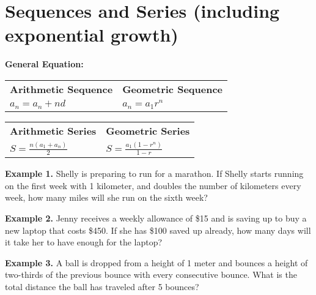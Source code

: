 \section{Sequences and Series (including exponential growth)}

\bigskip
\textbf{General Equation:}

\bigskip
\begin{tabularx}{\textwidth}{*2{@{}>{\centering\arraybackslash}X}}
\textbf{Arithmetic Sequence} & \textbf{Geometric Sequence}\\
$a_n=a_n+nd$ & $a_n=a_1r^n$
\end{tabularx}

\vfill
\begin{tabularx}{\textwidth}{*2{@{}>{\centering\arraybackslash}X}}
\textbf{Arithmetic Series} & \textbf{Geometric Series}\\
$S=\frac{n(a_1+a_n)}{2}$ & $S=\frac{a_1(1-r^n)}{1-r}$
\end{tabularx}

\vfill
\textbf{Example 1.} Shelly is preparing to run for a marathon. If Shelly starts running on the first week with 1 kilometer, and doubles the number of kilometers every week, how many miles will she run on the sixth week?

\vfill
\textbf{Example 2.} Jenny receives a weekly allowance of \$15 and is saving up to buy a new laptop that costs \$450. If she has \$100 saved up already, how many days will it take her to have enough for the laptop?

\vfill
\textbf{Example 3.} A ball is dropped from a height of 1 meter and bounces a height of two-thirds of the previous bounce with every consecutive bounce. What is the total distance the ball has traveled after 5 bounces?

